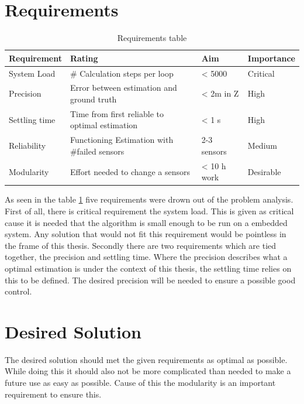  \section{Requirements}
 
 \begin{table}[h]
 \centering
 \begin{tabular}{|l|l|l|l|}	
 \hline	
 \bf{Requirement}   & \bf{Rating} & \bf{Aim} & \bf{Importance} \\ \hline
 System Load   & \# Calculation steps per loop & < 5000 & Critical \\ \hline
 Precision     & Error between estimation and ground truth  & < 2m in Z & High  \\ \hline
 Settling time & Time from first reliable to optimal estimation  & < 1 s &  High \\ \hline
 Reliability   & Functioning Estimation with \#failed sensors & 2-3 sensors & Medium \\ \hline	
 Modularity    & Effort needed to change a sensors & < 10 h work &  Desirable \\ \hline
 \end{tabular}	
 \caption{Requirements table}
 \label{tab:Requirements}
 \end{table}
 
 As seen in the table \ref{tab:Requirements} five requirements were drown out of the problem analysis. 
 First of all, there is critical requirement the system load. This is given as critical cause it is needed that the algorithm is small enough to be run on a embedded system.
 Any solution that would not fit this requirement would be pointless in the frame of this thesis.
 Secondly there are two requirements which are tied together, the precision and settling time.
 Where the precision describes what a optimal estimation is under the context of this thesis, the settling time relies on this to be defined.
 The desired precision will be needed to ensure a possible good control.
 
 \section{Desired Solution}
 The desired solution should met the given requirements as optimal as possible. While doing this it should also not be more complicated than needed
 to make a future use as easy as possible. Cause of this the modularity is an important requirement to ensure this.
